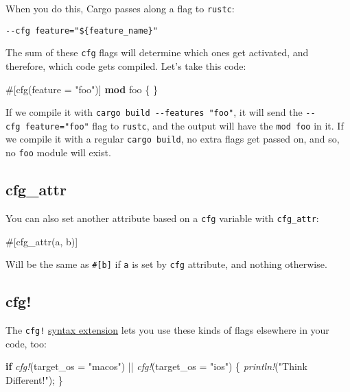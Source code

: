\documentclass[a4paper,]{book}
\newenvironment{Shaded}{\begin{snugshade}}{\end{snugshade}}
\newcommand{\KeywordTok}[1]{\textcolor[rgb]{0.13,0.29,0.53}{\textbf{{#1}}}}
\newcommand{\StringTok}[1]{\textcolor[rgb]{0.31,0.60,0.02}{{#1}}}
\newcommand{\PreprocessorTok}[1]{\textcolor[rgb]{0.56,0.35,0.01}{\textit{{#1}}}}
\newcommand{\AttributeTok}[1]{\textcolor[rgb]{0.77,0.63,0.00}{{#1}}}
\newcommand{\NormalTok}[1]{{#1}}
\begin{document}
When you do this, Cargo passes along a flag to \texttt{rustc}:

\begin{verbatim}
--cfg feature="${feature_name}"
\end{verbatim}

The sum of these \texttt{cfg} flags will determine which ones get
activated, and therefore, which code gets compiled. Let's take this
code:

\begin{Shaded}
\begin{Highlighting}[]
\AttributeTok{#[}\NormalTok{cfg}\AttributeTok{(}\NormalTok{feature }\AttributeTok{=} \StringTok{"foo"}\AttributeTok{)]}
\KeywordTok{mod} \NormalTok{foo \{}
\NormalTok{\}}
\end{Highlighting}
\end{Shaded}

If we compile it with \texttt{cargo\ build\ -\/-features\ "foo"}, it
will send the \texttt{-\/-cfg\ feature="foo"} flag to \texttt{rustc},
and the output will have the \texttt{mod\ foo} in it. If we compile it
with a regular \texttt{cargo\ build}, no extra flags get passed on, and
so, no \texttt{foo} module will exist.

\subsection{cfg\_attr}\label{cfgux5fattr}

You can also set another attribute based on a \texttt{cfg} variable with
\texttt{cfg\_attr}:

\begin{Shaded}
\begin{Highlighting}[]
\AttributeTok{#[}\NormalTok{cfg_attr}\AttributeTok{(}\NormalTok{a}\AttributeTok{,} \NormalTok{b}\AttributeTok{)]}
\end{Highlighting}
\end{Shaded}

Will be the same as \texttt{\#{[}b{]}} if \texttt{a} is set by
\texttt{cfg} attribute, and nothing otherwise.

\subsection{cfg!}\label{cfg}

The \texttt{cfg!} \protect\hyperlink{sec--compiler-plugins}{syntax
extension} lets you use these kinds of flags elsewhere in your code,
too:

\begin{Shaded}
\begin{Highlighting}[]
\KeywordTok{if} \PreprocessorTok{cfg!}\NormalTok{(target_os = }\StringTok{"macos"}\NormalTok{) || }\PreprocessorTok{cfg!}\NormalTok{(target_os = }\StringTok{"ios"}\NormalTok{) \{}
    \PreprocessorTok{println!}\NormalTok{(}\StringTok{"Think Different!"}\NormalTok{);}
\NormalTok{\}}
\end{Highlighting}
\end{Shaded}
\end{document}
